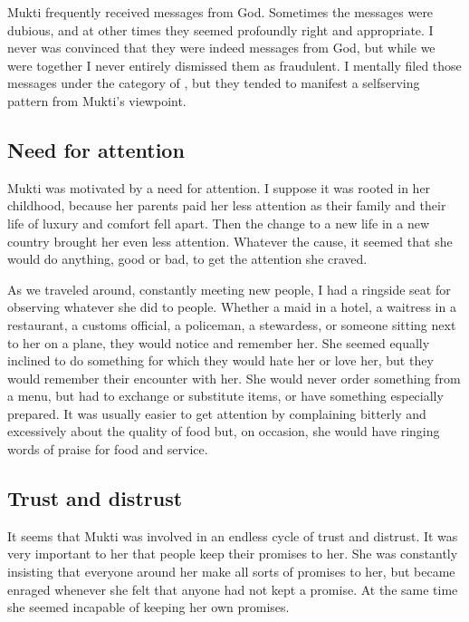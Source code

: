 \documentclass[a5paper,10pt,english]{book}
\begin{document}
\sphinxAtStartPar
Mukti frequently received messages from God. Sometimes the messages were
dubious, and at other times they seemed profoundly right and
appropriate. I never was convinced that they were indeed messages from
God, but while we were together I never entirely dismissed them as
fraudulent. I mentally filed those messages under the category of ,
but they tended to manifest a self\sphinxhyphen{}serving pattern from Mukti’s
viewpoint.


\subsection{Need for attention}
\label{\detokenize{psychopaths:need-for-attention}}
\sphinxAtStartPar
Mukti was motivated by a need for attention. I suppose it was rooted in
her childhood, because her parents paid her less attention as their
family and their life of luxury and comfort fell apart. Then the change
to a new life in a new country brought her even less attention. Whatever
the cause, it seemed that she would do anything, good or bad, to get the
attention she craved.

\sphinxAtStartPar
As we traveled around, constantly meeting new people, I had a ring\sphinxhyphen{}side
seat for observing whatever she did to people. Whether a maid in a
hotel, a waitress in a restaurant, a customs official, a policeman, a
stewardess, or someone sitting next to her on a plane, they would notice
and remember her. She seemed equally inclined to do something for which
they would hate her or love her, but they would remember their encounter
with her. She would never order something from a menu, but had to
exchange or substitute items, or have something especially prepared. It
was usually easier to get attention by complaining bitterly and
excessively about the quality of food but, on occasion, she would have
ringing words of praise for food and service.


\subsection{Trust and distrust}
\label{\detokenize{psychopaths:trust-and-distrust}}
\sphinxAtStartPar
It seems that Mukti was involved in an endless cycle of trust and
distrust. It was very important to her that people keep their promises
to her. She was constantly insisting that everyone around her make all
sorts of promises to her, but became enraged whenever she felt that
anyone had not kept a promise. At the same time she seemed incapable of
keeping her own promises.
\end{document}
